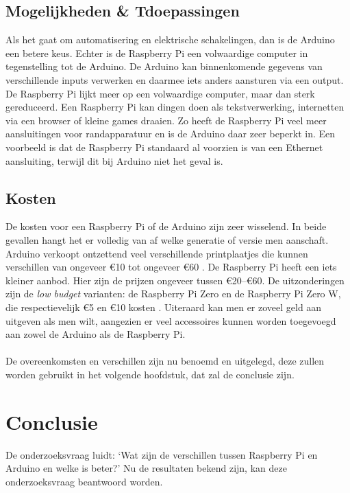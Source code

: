\documentclass[a4paper, dutch, abstract=true]{scrartcl}
\begin{document}
\subsection{Mogelijkheden \& Tdoepassingen}
Als het gaat om automatisering en elektrische schakelingen, dan is de Arduino een betere keus.
Echter is de Raspberry Pi een volwaardige computer in tegenstelling tot de Arduino.
De Arduino kan binnenkomende gegevens van verschillende inputs verwerken en daarmee iets anders
aansturen via een output.
De Raspberry Pi lijkt meer op een volwaardige computer, maar dan sterk gereduceerd.
Een Raspberry Pi kan dingen doen als tekstverwerking, internetten via een browser of kleine games
draaien.
Zo heeft de Raspberry Pi veel meer aansluitingen voor randapparatuur en is de Arduino daar zeer
beperkt in.
Een voorbeeld is dat de Raspberry Pi standaard al voorzien is van een Ethernet aansluiting,
terwijl dit bij Arduino niet het geval is.

\subsection{Kosten}
De kosten voor een Raspberry Pi of de Arduino zijn zeer wisselend.
In beide gevallen hangt het er volledig van af welke generatie of versie men aanschaft.
Arduino verkoopt ontzettend veel verschillende printplaatjes die kunnen verschillen van ongeveer
\euro10 tot ongeveer \euro60 \cite{arduino2019arduino}.
De Raspberry Pi heeft een iets kleiner aanbod.
Hier zijn de prijzen ongeveer tussen \euro20--\euro60.
De uitzonderingen zijn de \emph{low budget} varianten: de Raspberry Pi Zero en de Raspberry Pi Zero W, die
respectievelijk \euro5 en \euro10 kosten \cite{kiwi2019zoeken}.
Uiteraard kan men er zoveel geld aan uitgeven als men wilt, aangezien er veel accessoires kunnen
worden toegevoegd aan zowel de Arduino als de Raspberry Pi.

\paragraph*{}
De overeenkomsten en verschillen zijn nu benoemd en uitgelegd, deze zullen worden gebruikt in het
volgende hoofdstuk, dat zal de conclusie zijn.

\section{Conclusie}
De onderzoeksvraag luidt: `Wat zijn de verschillen tussen Raspberry Pi en Arduino en welke is
beter?'
Nu de resultaten bekend zijn, kan deze onderzoeksvraag beantwoord worden.
\end{document}
